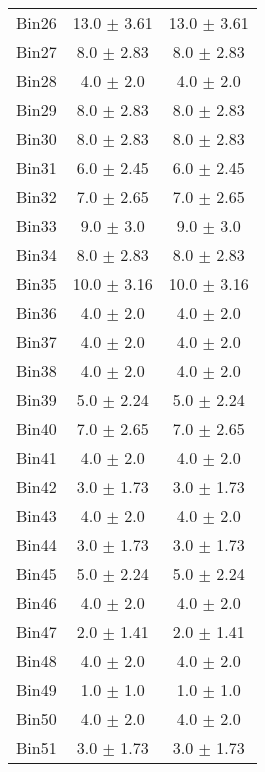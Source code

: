 \begin{tabular}{|c|c|c|}
     Bin26 & 13.0 $\pm$ 3.61 & 13.0 $\pm$ 3.61 \\ \cline{1-3} 
     Bin27 & 8.0 $\pm$ 2.83 & 8.0 $\pm$ 2.83 \\ \cline{1-3} 
     Bin28 & 4.0 $\pm$ 2.0 & 4.0 $\pm$ 2.0 \\ \cline{1-3} 
     Bin29 & 8.0 $\pm$ 2.83 & 8.0 $\pm$ 2.83 \\ \cline{1-3} 
     Bin30 & 8.0 $\pm$ 2.83 & 8.0 $\pm$ 2.83 \\ \cline{1-3} 
     Bin31 & 6.0 $\pm$ 2.45 & 6.0 $\pm$ 2.45 \\ \cline{1-3} 
     Bin32 & 7.0 $\pm$ 2.65 & 7.0 $\pm$ 2.65 \\ \cline{1-3} 
     Bin33 & 9.0 $\pm$ 3.0 & 9.0 $\pm$ 3.0 \\ \cline{1-3} 
     Bin34 & 8.0 $\pm$ 2.83 & 8.0 $\pm$ 2.83 \\ \cline{1-3} 
     Bin35 & 10.0 $\pm$ 3.16 & 10.0 $\pm$ 3.16 \\ \cline{1-3} 
     Bin36 & 4.0 $\pm$ 2.0 & 4.0 $\pm$ 2.0 \\ \cline{1-3} 
     Bin37 & 4.0 $\pm$ 2.0 & 4.0 $\pm$ 2.0 \\ \cline{1-3} 
     Bin38 & 4.0 $\pm$ 2.0 & 4.0 $\pm$ 2.0 \\ \cline{1-3} 
     Bin39 & 5.0 $\pm$ 2.24 & 5.0 $\pm$ 2.24 \\ \cline{1-3} 
     Bin40 & 7.0 $\pm$ 2.65 & 7.0 $\pm$ 2.65 \\ \cline{1-3} 
     Bin41 & 4.0 $\pm$ 2.0 & 4.0 $\pm$ 2.0 \\ \cline{1-3} 
     Bin42 & 3.0 $\pm$ 1.73 & 3.0 $\pm$ 1.73 \\ \cline{1-3} 
     Bin43 & 4.0 $\pm$ 2.0 & 4.0 $\pm$ 2.0 \\ \cline{1-3} 
     Bin44 & 3.0 $\pm$ 1.73 & 3.0 $\pm$ 1.73 \\ \cline{1-3} 
     Bin45 & 5.0 $\pm$ 2.24 & 5.0 $\pm$ 2.24 \\ \cline{1-3} 
     Bin46 & 4.0 $\pm$ 2.0 & 4.0 $\pm$ 2.0 \\ \cline{1-3} 
     Bin47 & 2.0 $\pm$ 1.41 & 2.0 $\pm$ 1.41 \\ \cline{1-3} 
     Bin48 & 4.0 $\pm$ 2.0 & 4.0 $\pm$ 2.0 \\ \cline{1-3} 
     Bin49 & 1.0 $\pm$ 1.0 & 1.0 $\pm$ 1.0 \\ \cline{1-3} 
     Bin50 & 4.0 $\pm$ 2.0 & 4.0 $\pm$ 2.0 \\ \cline{1-3} 
     Bin51 & 3.0 $\pm$ 1.73 & 3.0 $\pm$ 1.73 \\ \cline{1-3} 

\end{tabular}
